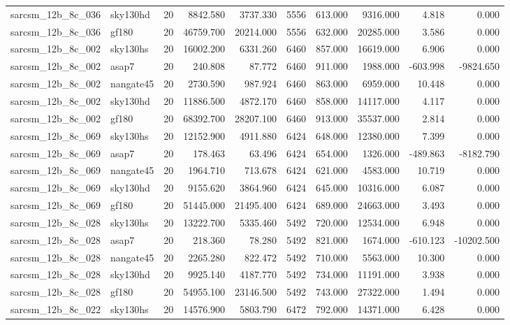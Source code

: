 \documentclass{article}
\begin{document}
\begin{longtable}{llrrrrrrrr}
sarcsm\_12b\_8c\_036 & sky130hd & 20 & 8842.580 & 3737.330 & 5556 & 613.000 & 9316.000 & 4.818 & 0.000 \\
sarcsm\_12b\_8c\_036 & gf180 & 20 & 46759.700 & 20214.000 & 5556 & 632.000 & 20285.000 & 3.586 & 0.000 \\
sarcsm\_12b\_8c\_002 & sky130hs & 20 & 16002.200 & 6331.260 & 6460 & 857.000 & 16619.000 & 6.906 & 0.000 \\
sarcsm\_12b\_8c\_002 & asap7 & 20 & 240.808 & 87.772 & 6460 & 911.000 & 1988.000 & -603.998 & -9824.650 \\
sarcsm\_12b\_8c\_002 & nangate45 & 20 & 2730.590 & 987.924 & 6460 & 863.000 & 6959.000 & 10.448 & 0.000 \\
sarcsm\_12b\_8c\_002 & sky130hd & 20 & 11886.500 & 4872.170 & 6460 & 858.000 & 14117.000 & 4.117 & 0.000 \\
sarcsm\_12b\_8c\_002 & gf180 & 20 & 68392.700 & 28207.100 & 6460 & 913.000 & 35537.000 & 2.814 & 0.000 \\
sarcsm\_12b\_8c\_069 & sky130hs & 20 & 12152.900 & 4911.880 & 6424 & 648.000 & 12380.000 & 7.399 & 0.000 \\
sarcsm\_12b\_8c\_069 & asap7 & 20 & 178.463 & 63.496 & 6424 & 654.000 & 1326.000 & -489.863 & -8182.790 \\
sarcsm\_12b\_8c\_069 & nangate45 & 20 & 1964.710 & 713.678 & 6424 & 621.000 & 4583.000 & 10.719 & 0.000 \\
sarcsm\_12b\_8c\_069 & sky130hd & 20 & 9155.620 & 3864.960 & 6424 & 645.000 & 10316.000 & 6.087 & 0.000 \\
sarcsm\_12b\_8c\_069 & gf180 & 20 & 51445.000 & 21495.400 & 6424 & 689.000 & 24663.000 & 3.493 & 0.000 \\
sarcsm\_12b\_8c\_028 & sky130hs & 20 & 13222.700 & 5335.460 & 5492 & 720.000 & 12534.000 & 6.948 & 0.000 \\
sarcsm\_12b\_8c\_028 & asap7 & 20 & 218.360 & 78.280 & 5492 & 821.000 & 1674.000 & -610.123 & -10202.500 \\
sarcsm\_12b\_8c\_028 & nangate45 & 20 & 2265.280 & 822.472 & 5492 & 710.000 & 5563.000 & 10.300 & 0.000 \\
sarcsm\_12b\_8c\_028 & sky130hd & 20 & 9925.140 & 4187.770 & 5492 & 734.000 & 11191.000 & 3.938 & 0.000 \\
sarcsm\_12b\_8c\_028 & gf180 & 20 & 54955.100 & 23146.500 & 5492 & 743.000 & 27322.000 & 1.494 & 0.000 \\
sarcsm\_12b\_8c\_022 & sky130hs & 20 & 14576.900 & 5803.790 & 6472 & 792.000 & 14371.000 & 6.428 & 0.000 \\

\end{longtable}
\end{document}
